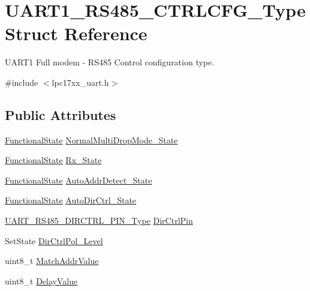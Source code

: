 \hypertarget{struct_u_a_r_t1___r_s485___c_t_r_l_c_f_g___type}{\section{\-U\-A\-R\-T1\-\_\-\-R\-S485\-\_\-\-C\-T\-R\-L\-C\-F\-G\-\_\-\-Type \-Struct \-Reference}
\label{struct_u_a_r_t1___r_s485___c_t_r_l_c_f_g___type}
}


\-U\-A\-R\-T1 \-Full modem -\/ \-R\-S485 \-Control configuration type.  




{\ttfamily \#include $<$lpc17xx\-\_\-uart.\-h$>$}

\subsection*{\-Public \-Attributes}
\begin{DoxyCompactItemize}
\item 
\hyperlink{group___l_p_c___types___public___types_gac9a7e9a35d2513ec15c3b537aaa4fba1}{\-Functional\-State} \hyperlink{struct_u_a_r_t1___r_s485___c_t_r_l_c_f_g___type_aa2f683b91877a1f1e583484352d9eadc}{\-Normal\-Multi\-Drop\-Mode\-\_\-\-State}
\item 
\hyperlink{group___l_p_c___types___public___types_gac9a7e9a35d2513ec15c3b537aaa4fba1}{\-Functional\-State} \hyperlink{struct_u_a_r_t1___r_s485___c_t_r_l_c_f_g___type_a087a5f4310b65eaf41efc5295b8b841e}{\-Rx\-\_\-\-State}
\item 
\hyperlink{group___l_p_c___types___public___types_gac9a7e9a35d2513ec15c3b537aaa4fba1}{\-Functional\-State} \hyperlink{struct_u_a_r_t1___r_s485___c_t_r_l_c_f_g___type_a93f18ca28cd7e67195e6d59c211a7709}{\-Auto\-Addr\-Detect\-\_\-\-State}
\item 
\hyperlink{group___l_p_c___types___public___types_gac9a7e9a35d2513ec15c3b537aaa4fba1}{\-Functional\-State} \hyperlink{struct_u_a_r_t1___r_s485___c_t_r_l_c_f_g___type_a6596686b19bae7e391c53cba9299a983}{\-Auto\-Dir\-Ctrl\-\_\-\-State}
\item 
\hyperlink{group___u_a_r_t___public___types_gabcfaaf12f325112107ff9b5c5cf1120c}{\-U\-A\-R\-T\-\_\-\-R\-S485\-\_\-\-D\-I\-R\-C\-T\-R\-L\-\_\-\-P\-I\-N\-\_\-\-Type} \hyperlink{struct_u_a_r_t1___r_s485___c_t_r_l_c_f_g___type_acfebf68b0964d3117933ff33be054227}{\-Dir\-Ctrl\-Pin}
\item 
\-Set\-State \hyperlink{struct_u_a_r_t1___r_s485___c_t_r_l_c_f_g___type_a8ef36fc7dfce726385b7114fb8429589}{\-Dir\-Ctrl\-Pol\-\_\-\-Level}
\item 
uint8\-\_\-t \hyperlink{struct_u_a_r_t1___r_s485___c_t_r_l_c_f_g___type_a56883cdc3cee7c7dab7859f55ae9848e}{\-Match\-Addr\-Value}
\item 
uint8\-\_\-t \hyperlink{struct_u_a_r_t1___r_s485___c_t_r_l_c_f_g___type_accdbb998ed22a2ba62ba6ed131dbae16}{\-Delay\-Value}
\end{DoxyCompactItemize}


